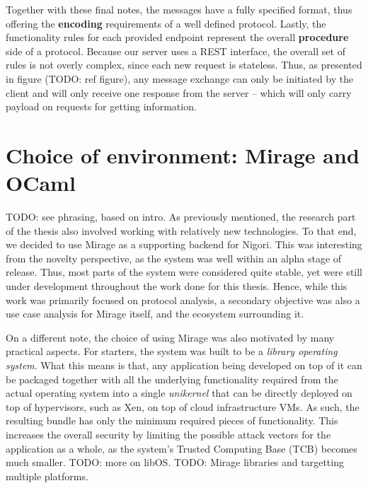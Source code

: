 Together with these final notes, the messages have a fully specified format, thus offering the \textbf{encoding} requirements of a well defined protocol.
Lastly, the functionality rules for each provided endpoint represent the overall \textbf{procedure} side of a protocol.
Because our server uses a REST interface, the overall set of rules is not overly complex, since each new request is stateless.
Thus, as presented in figure (TODO: ref figure), any message exchange can only be initiated by the client and will only receive one response from the server -- which will only carry payload on requests for getting information.

\section{Choice of environment: Mirage and OCaml}
TODO: see phrasing, based on intro.
As previously mentioned, the research part of the thesis also involved working with relatively new technologies.
To that end, we decided to use Mirage as a supporting backend for Nigori.
This was interesting from the novelty perspective, as the system was well within an alpha stage of release.
Thus, most parts of the system were considered quite stable, yet were still under development throughout the work done for this thesis.
Hence, while this work was primarily focused on protocol analysis, a secondary objective was also a use case analysis for Mirage itself, and the ecosystem surrounding it.

On a different note, the choice of using Mirage was also motivated by many practical aspects.
For starters, the system was built to be a \textit{library operating system}.
What this means is that, any application being developed on top of it can be packaged together with all the underlying functionality required from the actual operating system into a single \textit{unikernel} that can be directly deployed on top of hypervisors, such as Xen, on top of cloud infrastructure VMs.
As such, the resulting bundle has only the minimum required pieces of functionality.
This increases the overall security by limiting the possible attack vectors for the application as a whole, as the system's Trusted Computing Base (TCB) becomes much smaller.
TODO: more on libOS.
TODO: Mirage libraries and targetting multiple platforms.


